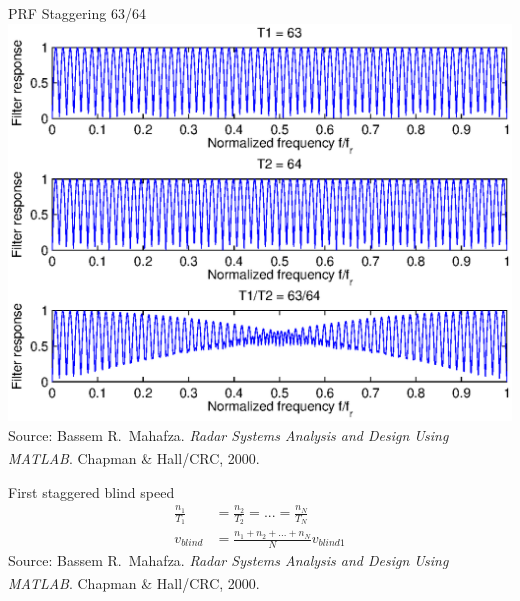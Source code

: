 \documentclass[mathserif]{beamer}
\begin{document}
   
    \begin{frame}{PRF Staggering 63/64}
    \includegraphics[width=\linewidth]{prfStaggering63_64} \\
      \tiny{Source: Bassem R.~Mahafza. \emph{Radar Systems Analysis and Design Using MATLAB\textsuperscript{\textregistered}}. Chapman \& Hall/CRC, 2000.}
    \end{frame}
    
    \begin{frame}{First staggered blind speed}
     \begin{align}
      \frac{n_1}{T_1} & = \frac{n_2}{T_2} = ... = \frac{n_N}{T_N} \nonumber \\
      v_{blind} & = \frac{n_1 + n_2 + ... + n_N}{N} v_{blind1} \nonumber
     \end{align}
     \vfill
     \vfill
     \vfill
     \vfill
     \vfill
      \tiny{Source: Bassem R.~Mahafza. \emph{Radar Systems Analysis and Design Using MATLAB\textsuperscript{\textregistered}}. Chapman \& Hall/CRC, 2000.}

    \end{frame}

    
    
\end{document}
